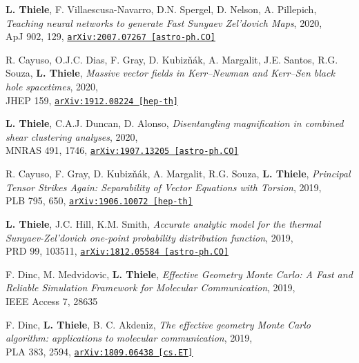 {\bf L. Thiele}, F. Villaescusa-Navarro, D.N. Spergel, D. Nelson, A. Pillepich,
\emph{Teaching neural networks to generate Fast Sunyaev Zel'dovich Maps}, 2020,\\
ApJ 902, 129,
\href{https://arxiv.org/abs/2007.07267}{\mbox{\texttt{arXiv:2007.07267 [astro-ph.CO]}}}

R. Cayuso, O.J.C. Dias, F. Gray, D. Kubiz\v{n}\'{a}k, A. Margalit, J.E. Santos,
R.G. Souza, {\bf L. Thiele},
\emph{Massive vector fields in Kerr--Newman and Kerr--Sen black hole spacetimes}, 2020,\\
JHEP 159,
\href{https://arxiv.org/abs/1912.08224}{\mbox{\texttt{arXiv:1912.08224 [hep-th]}}}

{\bf L. Thiele}, C.A.J. Duncan, D. Alonso,
\emph{Disentangling magnification in combined shear clustering analyses}, 2020,\\
MNRAS 491, 1746,
\href{https://arxiv.org/abs/1907.13205}{\mbox{\texttt{arXiv:1907.13205 [astro-ph.CO]}}}

R. Cayuso, F. Gray, D. Kubiz\v{n}\'{a}k, A. Margalit, R.G. Souza, {\bf L. Thiele},
\emph{Principal Tensor Strikes Again: Separability of Vector Equations with Torsion}, 2019,\\
PLB 795, 650,
\href{https://arxiv.org/abs/1906.10072}{\mbox{\texttt{arXiv:1906.10072 [hep-th]}}}

\newpage
\vspace*{0.5cm}

{\bf L. Thiele}, J.C. Hill, K.M. Smith, \emph{Accurate analytic model for the thermal
Sunyaev-Zel'dovich one-point probability distribution function}, 2019,\\
PRD 99, 103511,
\href{https://arxiv.org/abs/1812.05584}{\mbox{\texttt{arXiv:1812.05584 [astro-ph.CO]}}}

F. Dinc, M. Medvidovic, {\bf L. Thiele}, \emph{Effective Geometry Monte Carlo: A Fast and
Reliable Simulation Framework for Molecular Communication}, 2019,\\
IEEE Access 7, 28635

F. Dinc, {\bf L. Thiele}, B. C. Akdeniz, \emph{The effective geometry Monte Carlo
algorithm: applications to molecular communication}, 2019,\\
PLA 383, 2594,
\href{https://arxiv.org/abs/1809.06438}{\mbox{\texttt{arXiv:1809.06438 [cs.ET]}}}
